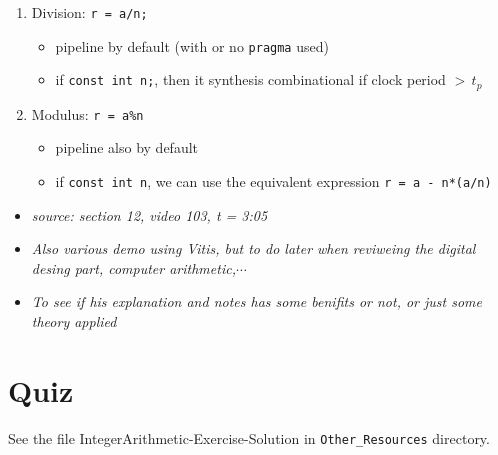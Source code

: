 \begin{enumerate}

\item Division: \verb|r = a/n;|

	\begin{itemize}
	\item pipeline by default (with or no \verb|pragma| used)
	
	\item if \verb|const int n;|, then it synthesis combinational if clock period $> \, t_p$
	\end{itemize}

\item Modulus: \verb|r = a%n|

	\begin{itemize}
	\item pipeline also by default
	
	\item if \verb|const int n|, we can use the equivalent expression \verb|r = a - n*(a/n)|
	\end{itemize}

\end{enumerate}


 

\begin{itemize}

\item  \textit{source: section 12, video 103, t = 3:05}

\item \textit{Also various demo using Vitis, but to do later when reviweing the digital desing part, computer arithmetic,$\cdots$}

\item \textit{To see if his explanation and notes has some benifits or not, or just some theory applied}

\end{itemize}

\section{Quiz}

See the file IntegerArithmetic-Exercise-Solution in \verb|Other_Resources| directory.
